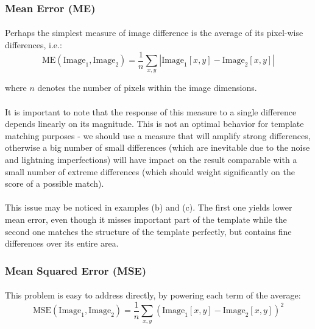 \subsubsection{Mean Error (ME)}

\paragraph*{}
Perhaps the simplest measure of image difference is the average of its pixel-wise differences, i.e.:
\[
	\mbox{ME}(\mbox{Image}_1,\mbox{Image}_2) = \frac{1}{n} \sum_{x,y} |\mbox{Image}_1[x,y] - \mbox{Image}_2[x,y]|
\]

where $n$ denotes the number of pixels within the image dimensions.

\paragraph*{}
It is important to note that the response of this measure to a single difference depends linearly on its magnitude. This is not an optimal behavior for template matching purposes - we should use a measure that will amplify strong differences, otherwise a big number of small differences (which are inevitable due to the noise and lightning imperfections) will have impact on the result comparable with a small number of extreme differences (which should weight significantly on the score of a possible match).

\paragraph*{}
This issue may be noticed in  examples (b) and (c). The first one yields lower mean error, even though it misses important part of the template while the second one matches the structure of the template perfectly, but contains fine differences over its entire area. 

\subsubsection{Mean Squared Error (MSE)}

\paragraph*{}
This problem is easy to address directly, by powering each term of the average:
\[
	\mbox{MSE}(\mbox{Image}_1,\mbox{Image}_2) = \frac{1}{n} \sum_{x,y} (\mbox{Image}_1[x,y] - \mbox{Image}_2[x,y])^2
\]

